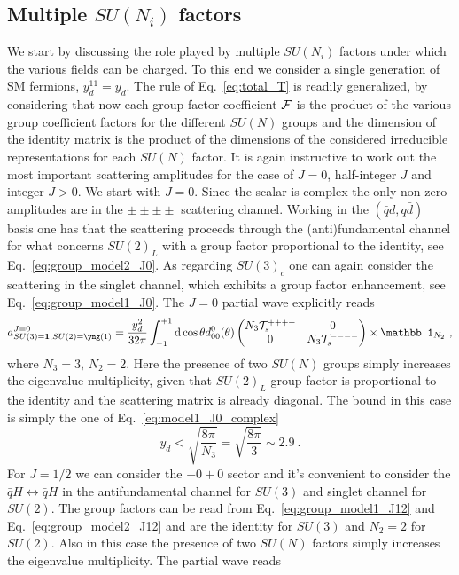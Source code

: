 \documentclass[a4paper,11pt]{article}
\newcommand{\be}{\begin{equation}}
\newcommand{\ee}{\end{equation}}
\begin{document}
\subsection{Multiple $SU(N_i)$ factors}\label{sec:sm_gauge_mult}

We start by discussing the role played by multiple $SU(N_i)$ factors under which the various fields can be charged. To this end we consider a single generation of SM fermions, $y_d^{11}=y_d$. The rule of Eq.~\eqref{eq:total_T} is readily generalized, by considering that now each group  factor coefficient ${\cal F}$ is the product of the various group coefficient factors for the different $SU(N)$ groups and the dimension of the identity matrix is the product of the dimensions of the considered irreducible representations for each $SU(N)$ factor. It is again instructive to work out the most important scattering amplitudes for the case of $J=0$, half-integer $J$ and integer $J>0$. We start  with $J=0$. Since the scalar is complex the only non-zero amplitudes are in the $\pm\pm\pm\pm$ scattering channel. Working in the $(\bar q d, q \bar d)$ basis one has that the scattering proceeds through the (anti)fundamental channel for what concerns $SU(2)_L$ with a group factor proportional to the identity, see Eq.~\eqref{eq:group_model2_J0}.
As regarding $SU(3)_c$ one can again consider the scattering in the singlet channel, which exhibits a group factor enhancement, see Eq.~\eqref{eq:group_model1_J0}.
The $J=0$ partial wave explicitly reads
\be
a^{J=0}_{SU(3)={\bf 1}, SU(2)= {\tiny{\yng(1)}}}= \frac{y_d^2}{32\pi} \int_{-1}^{+1}{\rm d}\cos\theta d^0_{00}(\theta) 
\begin{pmatrix}
N_3 {\cal T}_s^{++++}  & 0 \\
0 &N_3 {\cal T}_s^{----} 
\end{pmatrix}
\times
 {\mathbb 1}_{N_2} \ ,
\ee 
where $N_3=3$, $N_2=2$.
 Here the  presence of two $SU(N)$ groups simply increases the eigenvalue multiplicity, given that $SU(2)_L$ group factor is proportional to the identity and the scattering matrix is already diagonal. The bound in this case is simply the one of Eq.~\eqref{eq:model1_J0_complex}
\be\label{eq:bound_sm_yuk}
y_d < \sqrt{\frac{8\pi}{N_3}} = \sqrt{\frac{8\pi}{3}} \sim 2.9 \ .
\ee
For $J=1/2$ we can consider the $+0+0$ sector and it's convenient to consider the $\bar q H \leftrightarrow \bar q H$ in the antifundamental channel for $SU(3)$ and singlet channel for $SU(2)$. The group factors
can be read from Eq.~\eqref{eq:group_model1_J12} and Eq.~\eqref{eq:group_model2_J12} and are the identity for $SU(3)$ and $N_2=2$ for  $SU(2)$. Also in this case the presence of two $SU(N)$ factors simply increases the eigenvalue multiplicity.  The partial wave reads
\end{document}

